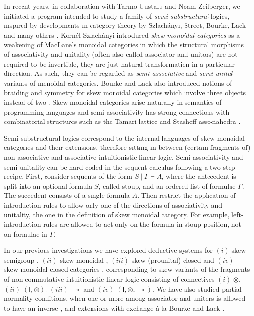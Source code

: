 \documentclass[submission,copyright,creativecommons]{eptcs}
\theoremstyle{definition}
\newcommand{\lolli}{\multimap}
\newcommand{\I}{\mathsf{I}}
\begin{document}
In recent years, in collaboration with Tarmo Uustalu and Noam Zeilberger, we initiated a program intended to study a family of \emph{semi-substructural} logics, inspired by developments in category theory by Szlach{\'a}nyi, Street, Bourke, Lack and many others \cite{szlachanyi:skew-monoidal:2012,lack:skew:2012,street:skew-closed:2013,lack:triangulations:2014,buckley:catalan:2015,bourke:skew:2017,bourke:skew:2018,bourke:lack:braided:2020}. Korn{\'e}l Szlach\'anyi introduced \emph{skew monoidal categories} as a weakening of MacLane's monoidal categories in which the structural morphisms of associativity and unitality (often also called associator and unitors) are not required to be invertible, they are just natural transformation in a particular direction. As such, they can be regarded as \emph{semi-associative} and \emph{semi-unital} variants of monoidal categories. Bourke and Lack also introduced notions of braiding and symmetry for skew monoidal categories which involve three objects instead of two \cite{bourke:lack:braided:2020}. Skew monoidal categories arise naturally in semantics of programming languages \cite{altenkirch:monads:2014} and semi-associativity has strong connections with combinatorial structures such as the Tamari lattice and Stasheff associahedra \cite{zeilberger:semiassociative:19,moortgat:tamari:20}.

Semi-substructural logics correspond to the internal languages of skew monoidal categories and their extensions, therefore sitting in between (certain fragments of) non-associative and associative intuitionistic linear logic. Semi-associativity and semi-unitality can be hard-coded in the sequent calculus following a two-step recipe. First, consider sequents of the form $S \mid \Gamma \vdash A$, where the antecedent is split into an optional formula $S$, called stoup, and an ordered list of formulae $\Gamma$. The succedent consists of a single formula $A$. Then restrict the application of introduction rules to allow only one of the directions of associativity and unitality, the one in the definition of skew monoidal category. For example, left-introduction rules are allowed to act only on the formula in stoup position, not on formulae in $\Gamma$.

In our previous investigations we have explored deductive systems for $(i)$ skew semigroup \cite{zeilberger:semiassociative:19}, $(ii)$ skew monoidal \cite{uustalu:sequent:2021}, $(iii)$ skew (prounital) closed \cite{uustalu:deductive:nodate} and $(iv)$ skew monoidal closed categories \cite{UVW:protsn,veltri:multifocus:23}, corresponding to skew variants of the fragments of non-commutative intuitionistic linear logic consisting of connectives $(i)$ $\otimes$, $(ii)$ $(\I,\otimes)$, $(iii)$ $\lolli$ and $(iv)$ $(\I,\otimes,\lolli)$. We have also studied partial normality conditions, when one or more among associator and unitors is allowed to have an inverse \cite{uustalu:proof:nodate}, and extensions with exchange {\`a} la Bourke and Lack \cite{veltri:coherence:2021,Veltri25}.
\end{document}
